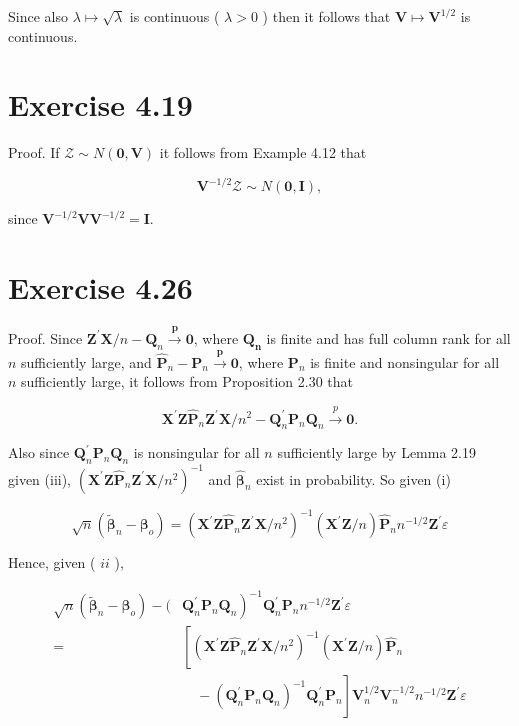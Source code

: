 \documentclass[10pt]{article}
\begin{document}
Since also $\lambda \mapsto \sqrt{\lambda}$ is continuous ( $\lambda>0$ ) then it follows that $\mathbf{V} \mapsto \mathbf{V}^{1 / 2}$ is continuous.

\section*{Exercise 4.19}
Proof. If $\mathcal{Z} \sim N(\mathbf{0}, \mathbf{V})$ it follows from Example 4.12 that

$$
\mathbf{V}^{-1 / 2} \mathcal{Z} \sim N(\mathbf{0}, \mathbf{I}),
$$

since $\mathbf{V}^{-1 / 2} \mathbf{V V}^{-1 / 2}=\mathbf{I}$.

\section*{Exercise 4.26}
Proof. Since $\mathbf{Z}^{\prime} \mathbf{X} / n-\mathbf{Q}_{n} \xrightarrow{\boldsymbol{p}} \mathbf{0}$, where $\mathbf{Q}_{\boldsymbol{n}}$ is finite and has full column rank for all $n$ sufficiently large, and $\hat{\mathbf{P}}_{n}-\mathbf{P}_{n} \xrightarrow{\boldsymbol{p}} \mathbf{0}$, where $\mathbf{P}_{n}$ is finite and nonsingular for all $n$ sufficiently large, it follows from Proposition 2.30 that

$$
\mathbf{X}^{\prime} \mathbf{Z} \hat{\mathbf{P}}_{n} \mathbf{Z}^{\prime} \mathbf{X} / n^{2}-\mathbf{Q}_{n}^{\prime} \mathbf{P}_{n} \mathbf{Q}_{n} \xrightarrow{p} \mathbf{0} .
$$

Also since $\mathbf{Q}_{n}^{\prime} \mathbf{P}_{n} \mathbf{Q}_{n}$ is nonsingular for all $n$ sufficiently large by Lemma 2.19 given (iii), $\left(\mathbf{X}^{\prime} \mathbf{Z} \hat{\mathbf{P}}_{n} \mathbf{Z}^{\prime} \mathbf{X} / n^{2}\right)^{-1}$ and $\hat{\boldsymbol{\beta}}_{n}$ exist in probability. So given (i)

$$
\sqrt{n}\left(\tilde{\boldsymbol{\beta}}_{n}-\boldsymbol{\beta}_{o}\right)=\left(\mathbf{X}^{\prime} \mathbf{Z} \hat{\mathbf{P}}_{n} \mathbf{Z}^{\prime} \mathbf{X} / n^{2}\right)^{-1}\left(\mathbf{X}^{\prime} \mathbf{Z} / n\right) \hat{\mathbf{P}}_{n} n^{-1 / 2} \mathbf{Z}^{\prime} \varepsilon
$$

Hence, given ( $i i$ ),

$$
\begin{aligned}
\sqrt{n}\left(\tilde{\boldsymbol{\beta}}_{n}-\boldsymbol{\beta}_{o}\right)-( & \left.\mathbf{Q}_{n}^{\prime} \mathbf{P}_{n} \mathbf{Q}_{n}\right)^{-1} \mathbf{Q}_{n}^{\prime} \mathbf{P}_{n} n^{-1 / 2} \mathbf{Z}^{\prime} \varepsilon \\
= & {\left[\left(\mathbf{X}^{\prime} \mathbf{Z} \hat{\mathbf{P}}_{n} \mathbf{Z}^{\prime} \mathbf{X} / n^{2}\right)^{-1}\left(\mathbf{X}^{\prime} \mathbf{Z} / n\right) \hat{\mathbf{P}}_{n}\right.} \\
& \left.\quad-\left(\mathbf{Q}_{n}^{\prime} \mathbf{P}_{n} \mathbf{Q}_{n}\right)^{-1} \mathbf{Q}_{n}^{\prime} \mathbf{P}_{n}\right] \mathbf{V}_{n}^{1 / 2} \mathbf{V}_{n}^{-1 / 2} n^{-1 / 2} \mathbf{Z}^{\prime} \varepsilon
\end{aligned}
$$
\end{document}
